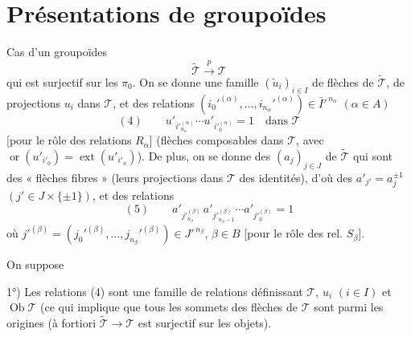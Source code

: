 \documentclass[11pt,a4paper]{article}
\begin{document}
\section{Présentations de groupoïdes}


Cas d'un   groupoïdes
\[
  \widetilde{\mathcal{T}} \xrightarrow{\;p\;} \mathcal{T}
\]
qui est surjectif sur les $\pi_0$. On se donne une famille $(\tilde{u}_i)_{i \in I}$
de flèches de $\widetilde{\mathcal{T}}$,  de projections $u_i$
dans $\mathcal{T}$, et des relations
 $(i_0'^{(\alpha)}, \ldots, i_{n_\alpha}'^{(\alpha)}) \in \bar{I}'^{\,n_\alpha}$ $(\alpha \in A)$
\[
  (4) \qquad u'_{i'^{(\alpha)}_{n_\alpha}} \cdots u'_{i'^{(\alpha)}_{0}} = 1
  \quad \text{dans } \mathcal{T}
\]
[pour le rôle des relations $R_\alpha$] (flèches composables dans $\mathcal{T}$, avec
$\operatorname{or}(u'_{i'_0}) = \operatorname{ext}(u'_{i'_n})$). De plus, on se donne des
  $(a_j)_{j \in J}$ de $\widetilde{\mathcal{T}}$ qui sont des
« flèches fibres » (leurs projections dans $\mathcal{T}$ des identités),
 d'où des $a'_{j'} = a_j^{\pm 1}$ $(j' \in J \times \{\pm 1\})$, et des
relations
\[
  (5) \qquad a'_{j'^{(\beta)}_{n_\beta}}\, a'_{j'^{(\beta)}_{n_\beta - 1}} \cdots a'_{j'^{(\beta)}_0} = 1
\]
où $j'^{(\beta)} = (j_0'^{(\beta)}, \ldots, j_{n_\beta}'^{(\beta)}) \in J'^{\,n_\beta}$, $\beta \in B$
[pour le rôle des rel. $S_\beta$].

On suppose

1°) Les relations (4) sont une famille de relations définissant $\mathcal{T}$,   $u_i$ $(i \in I)$ et $\operatorname{Ob}\mathcal{T}$ (ce qui
implique que tous les sommets  des flèches de $\mathcal{T}$ sont parmi les
origines  (à fortiori $\widetilde{\mathcal{T}} \to \mathcal{T}$ est
surjectif sur les objets). 

\end{document}
